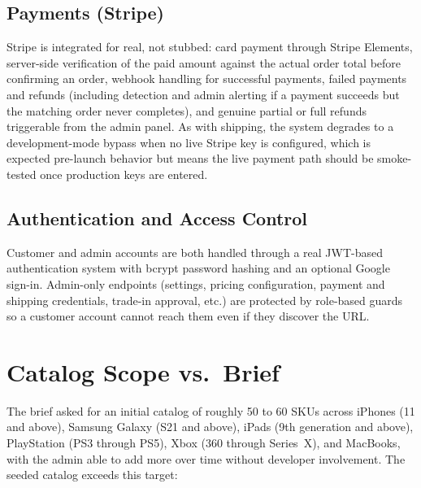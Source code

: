 \documentclass[11pt,a4paper]{article}
\begin{document}
\subsection{Payments (Stripe)}

Stripe is integrated for real, not stubbed: card payment through Stripe Elements, server-side verification of the paid amount against the actual order total before confirming an order, webhook handling for successful payments, failed payments and refunds (including detection and admin alerting if a payment succeeds but the matching order never completes), and genuine partial or full refunds triggerable from the admin panel. As with shipping, the system degrades to a development-mode bypass when no live Stripe key is configured, which is expected pre-launch behavior but means the live payment path should be smoke-tested once production keys are entered.

\subsection{Authentication and Access Control}

Customer and admin accounts are both handled through a real JWT-based authentication system with bcrypt password hashing and an optional Google sign-in. Admin-only endpoints (settings, pricing configuration, payment and shipping credentials, trade-in approval, etc.) are protected by role-based guards so a customer account cannot reach them even if they discover the URL.

\newpage

\section{Catalog Scope vs.\ Brief}

The brief asked for an initial catalog of roughly 50 to 60 SKUs across iPhones (11 and above), Samsung Galaxy (S21 and above), iPads (9th generation and above), PlayStation (PS3 through PS5), Xbox (360 through Series~X), and MacBooks, with the admin able to add more over time without developer involvement. The seeded catalog exceeds this target:
\end{document}
